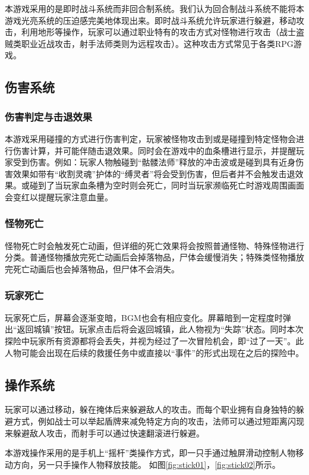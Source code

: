 \documentclass[UTF8,AutoFakeBold=1,AutoFakeSlant,zihao=-4]{cucthesis}
\begin{document}
本游戏采用的是即时战斗系统而非回合制系统。我们认为回合制战斗系统不能将本游戏光亮系统的压迫感完美地体现出来。即时战斗系统允许玩家进行躲避，移动攻击，利用地形等操作，玩家可以通过职业特有的攻击方式对怪物进行攻击（战士盗贼类职业近战攻击，射手法师类则为远程攻击）。这种攻击方式常见于各类RPG游戏。


\subsection{伤害系统}

\subsubsection{伤害判定与击退效果}

本游戏采用碰撞的方式进行伤害判定，玩家被怪物攻击到或是碰撞到特定怪物会进行伤害计算，并可能伴随击退效果。同时会在游戏中的血条槽进行显示，并提醒玩家受到伤害。例如：玩家人物触碰到“骷髅法师”释放的冲击波或是碰到具有近身伤害效果如带有“收割灵魂”护体的“缚灵者”将会受到伤害，但后者并不会触发击退效果。或碰到了当玩家血条槽为空时则会死亡，同时当玩家濒临死亡时游戏周围画面会变红以提醒玩家注意血量。

\subsubsection{怪物死亡}
怪物死亡时会触发死亡动画，但详细的死亡效果将会按照普通怪物、特殊怪物进行分类。普通怪物播放完死亡动画后会掉落物品，尸体会缓慢消失；特殊类怪物播放完死亡动画后也会掉落物品，但尸体不会消失。

\subsubsection{玩家死亡}
玩家死亡后，屏幕会逐渐变暗，BGM也会有相应变化。屏幕暗到一定程度时弹出“返回城镇”按钮。玩家点击后将会返回城镇，此人物视为“失踪”状态。同时本次探险中玩家所有资源都将会丢失，并视为经过了一次冒险机会，即“过了一天”。此人物可能会出现在后续的救援任务中或直接以“事件”的形式出现在之后的探险中。


\subsection{操作系统}
玩家可以通过移动，躲在掩体后来躲避敌人的攻击。而每个职业拥有自身独特的躲避方式，例如战士可以举起盾牌来减免特定方向的攻击，法师可以通过短距离闪现来躲避敌人攻击，而射手可以通过快速翻滚进行躲避。

本游戏操作采用的是手机上“摇杆”类操作方式，即一只手通过触屏滑动控制人物移动方向，另一只手操作人物释放技能。
如图\ref{fig:stick01}，\ref{fig:stick02}所示。
\end{document}
